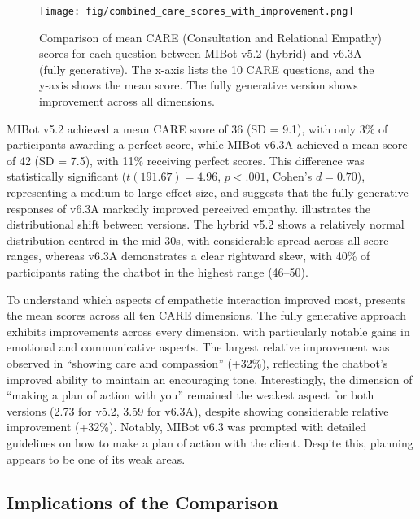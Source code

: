 \begin{figure}[htbp]
	\centering
	\texttt{[image: fig/combined\_care\_scores\_with\_improvement.png]}
	\caption[Comparison of Mean CARE Scores per Question]{Comparison of mean CARE (Consultation and Relational Empathy) scores for each question between MIBot v5.2 (hybrid) and v6.3A (fully generative). The x-axis lists the 10 CARE questions, and the y-axis shows the mean score. The fully generative version shows improvement across all dimensions.}
	\label{fig:care_questions}
\end{figure}

MIBot v5.2 achieved a mean CARE score of 36 (SD = 9.1), with only 3\% of participants awarding a perfect score, while MIBot v6.3A achieved a mean score of 42 (SD = 7.5), with 11\% receiving perfect scores. This difference was statistically significant ($t(191.67) = 4.96$, $p < .001$, Cohen's $d = 0.70$), representing a medium-to-large effect size, and suggests that the fully generative responses of v6.3A markedly improved perceived empathy.  illustrates the distributional shift between versions. The hybrid v5.2 shows a relatively normal distribution centred in the mid-30s, with considerable spread across all score ranges, whereas v6.3A demonstrates a clear rightward skew, with 40\% of participants rating the chatbot in the highest range (46--50).

To understand which aspects of empathetic interaction improved most,  presents the mean scores across all ten CARE dimensions. The fully generative approach exhibits improvements across every dimension, with particularly notable gains in emotional and communicative aspects. The largest relative improvement was observed in ``showing care and compassion'' (+32\%), reflecting the chatbot's improved ability to maintain an encouraging tone. Interestingly, the dimension of ``making a plan of action with you'' remained the weakest aspect for both versions (2.73 for v5.2, 3.59 for v6.3A), despite showing considerable relative improvement (+32\%). Notably, MIBot v6.3 was prompted with detailed guidelines on how to make a plan of action with the client. Despite this, planning appears to be one of its weak areas.



\subsection*{Implications of the Comparison}

